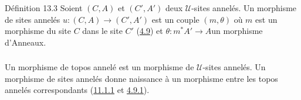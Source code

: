 \documentclass[10pt]{../fichiers-configuration-latex/smfart}
\begin{document}
\begin{enonce*}{Définition 13.3}
Soient $(C,A)$ et $(C',A')$ deux $𝒰$-sites annelés. Un
morphisme de sites annelés $u:(C,A)\rightarrow (C',A')$ est un
couple $(m,\theta)$ où $m$ est un morphisme du site $C$ dans le site
$C'$ (\hyperref[IV.subsec4.9]{4.9}) et $\theta:m^{\ast}A'\rightarrow
A$\pageoriginale {}un morphisme d'Anneaux.
\end{enonce*}

\setcounter{subsection}{3} \setcounter{subsubsection}{0}
\subsubsection{}
Un morphisme de topos annelé est un morphisme de $𝒰$-sites
annelés. Un morphisme de sites annelés donne naissance à un
morphisme entre les topos annelés correspondants
(\hyperref[IV.subsubsec11.1.1]{11.1.1} et \hyperref[IV.subsubsec4.9.1]{4.9.1}).
\end{document}

